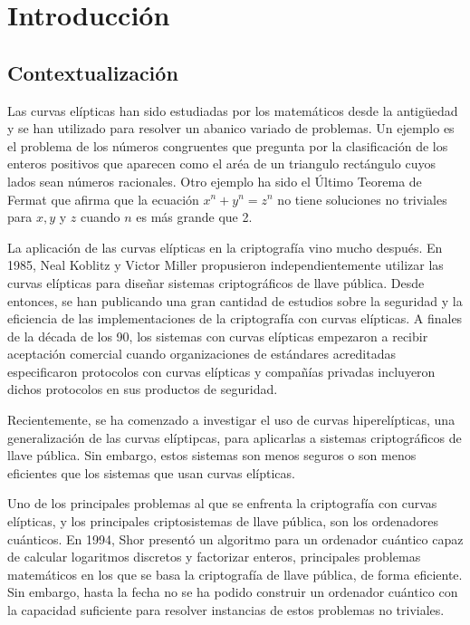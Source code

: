 \chapter{Introducción}
\label{ch:Introducción}

\section{Contextualización}
\label{sub:Contextualización}


Las curvas elípticas han sido estudiadas por los matemáticos desde la antigüedad y se han utilizado para resolver un abanico variado de problemas. Un ejemplo es el problema de los números congruentes que pregunta por la clasificación de los enteros positivos que aparecen como el aréa de un triangulo rectángulo cuyos lados sean números racionales. Otro ejemplo ha sido el Último Teorema de Fermat que afirma que la ecuación $x^n + y^n = z^n$ no tiene soluciones no triviales para $x, y$ y $z$ cuando $n$ es más grande que 2.

La aplicación de las curvas elípticas en la criptografía vino mucho después. En 1985, Neal Koblitz y Victor Miller propusieron independientemente utilizar las curvas elípticas para diseñar sistemas criptográficos de llave pública. Desde entonces, se han publicando una gran cantidad de estudios sobre la seguridad y la eficiencia de las implementaciones de la criptografía con curvas elípticas. A finales de la década de los 90, los sistemas con curvas elípticas empezaron a recibir aceptación comercial cuando organizaciones de estándares acreditadas especificaron protocolos con curvas elípticas y compañías privadas incluyeron dichos protocolos en sus productos de seguridad.

Recientemente, se ha comenzado a investigar el uso de curvas hiperelípticas, una generalización de las curvas elíptipcas, para aplicarlas a sistemas criptográficos de llave pública. Sin embargo, estos sistemas son menos seguros o son menos eficientes que los sistemas que usan curvas elípticas.

Uno de los principales problemas al que se enfrenta la criptografía con curvas elípticas, y los principales criptosistemas de llave pública, son los ordenadores cuánticos. En 1994, Shor presentó un algoritmo para un ordenador cuántico capaz de calcular logaritmos discretos y factorizar enteros, principales problemas matemáticos en los que se basa la criptografía de llave pública, de forma eficiente. Sin embargo, hasta la fecha no se ha podido construir un ordenador cuántico con la capacidad suficiente para resolver instancias de estos problemas no triviales.

